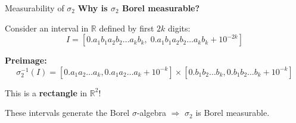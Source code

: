 \documentclass[aspectratio=169]{beamer}
\newcommand{\R}{\mathbb{R}}
\begin{document}
\begin{frame}{Measurability of $\sigma_2$}
\textbf{Why is $\sigma_2$ Borel measurable?}

\vspace{0.3cm}
Consider an interval in $\R$ defined by first $2k$ digits:
\[
I = [0.a_1b_1a_2b_2\ldots a_kb_k, \; 0.a_1b_1a_2b_2\ldots a_kb_k + 10^{-2k}]
\]

\textbf{Preimage:}
\[
\sigma_2^{-1}(I) = [0.a_1a_2\ldots a_k, 0.a_1a_2\ldots a_k + 10^{-k}] \times [0.b_1b_2\ldots b_k, 0.b_1b_2\ldots b_k + 10^{-k}]
\]

This is a \textbf{rectangle} in $\R^2$!

\begin{center}
\end{center}

These intervals generate the Borel $\sigma$-algebra $\Rightarrow$ $\sigma_2$ is Borel measurable.
\end{frame}
\end{document}
